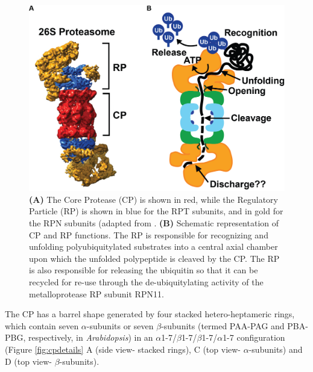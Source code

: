 \begin{figure}[p]
	\centering
	\includegraphics[width=\columnwidth]{intro/proteasome.png}
	{ \textbf{(A)} The Core Protease (CP) is shown in red, while the Regulatory Particle (RP) is shown in blue for the RPT subunits, and in gold for the RPN subunits (adapted from \citep{lasker12}. \textbf{(B)} Schematic representation of CP and RP functions. The RP is responsible for recognizing and unfolding polyubiquitylated substrates into a central axial chamber upon which the unfolded polypeptide is cleaved by the CP. The RP is also responsible for releasing the ubiquitin so that it can be recycled for re-use through the de-ubiquitylating activity of the metalloprotease RP subunit RPN11. }
	\label{fig:proteasome}
\end{figure}

The CP has a barrel shape generated by four stacked hetero-heptameric rings, which contain seven $\alpha$-subunits or seven $\beta$-subunits (termed PAA-PAG and PBA-PBG, respectively, in \textit{Arabidopsis}) in an $\alpha$1-7/$\beta$1-7/$\beta$1-7/$\alpha$1-7 configuration (Figure \ref{fig:cpdetails} A (side view- stacked rings), C (top view- $\alpha$-subunits) and D (top view- $\beta$-subunits).

